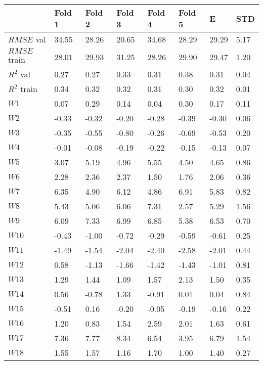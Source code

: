 \documentclass{article}
\begin{document}
\begin{longtable}{llllllll}
    \toprule
            &	Fold 1  &   Fold 2 & Fold 3  & Fold 4 & Fold 5   & E & STD   \\
    \midrule
    $RMSE$ val    & 34.55 & 28.26 & 20.65 & 34.68 & 28.29 & 29.29 & 5.17 \\
    $RMSE$ train    & 28.01 & 29.93 & 31.25 & 28.26 & 29.90 & 29.47 & 1.20 \\
    $R^2$ val   & 0.27  & 0.27  & 0.33  & 0.31  & 0.38  & 0.31  & 0.04 \\
    $R^2$ train   & 0.34  & 0.32  & 0.32  & 0.31  & 0.30  & 0.32  & 0.01 \\
    $W1$ &   0.07  & 0.29  & 0.14  & 0.04  & 0.30  & 0.17  & 0.11 \\
    $W2$ &   -0.33 & -0.32 & -0.20 & -0.28 & -0.39 & -0.30 & 0.06 \\
    $W3$ &   -0.35 & -0.55 & -0.80 & -0.26 & -0.69 & -0.53 & 0.20 \\
    $W4$ &   -0.01 & -0.08 & -0.19 & -0.22 & -0.15 & -0.13 & 0.07 \\
    $W5$ &   3.07  & 5.19  & 4.96  & 5.55  & 4.50  & 4.65  & 0.86 \\
    $W6$ &   2.28  & 2.36  & 2.37  & 1.50  & 1.76  & 2.06  & 0.36 \\
    $W7$ &   6.35  & 4.90  & 6.12  & 4.86  & 6.91  & 5.83  & 0.82 \\
    $W8$ &   5.43  & 5.06  & 6.06  & 7.31  & 2.57  & 5.29  & 1.56 \\
    $W9$ &   6.09  & 7.33  & 6.99  & 6.85  & 5.38  & 6.53  & 0.70 \\
    $W10$ &   -0.43 & -1.00 & -0.72 & -0.29 & -0.59 & -0.61 & 0.25 \\
    $W11$ &   -1.49 & -1.54 & -2.04 & -2.40 & -2.58 & -2.01 & 0.44 \\
    $W12$ &   0.58  & -1.13 & -1.66 & -1.42 & -1.43 & -1.01 & 0.81 \\
    $W13$ &   1.29  & 1.44  & 1.09  & 1.57  & 2.13  & 1.50  & 0.35 \\
    $W14$ &   0.56  & -0.78 & 1.33  & -0.91 & 0.01  & 0.04  & 0.84 \\
    $W15$ &   -0.51 & 0.16  & -0.20 & -0.05 & -0.19 & -0.16 & 0.22 \\
    $W16$ &   1.20  & 0.83  & 1.54  & 2.59  & 2.01  & 1.63  & 0.61 \\
    $W17$ &   7.36  & 7.77  & 8.34  & 6.54  & 3.95  & 6.79  & 1.54 \\
    $W18$ &   1.55  & 1.57  & 1.16  & 1.70  & 1.00  & 1.40  & 0.27 \\

\end{longtable}
\end{document}
